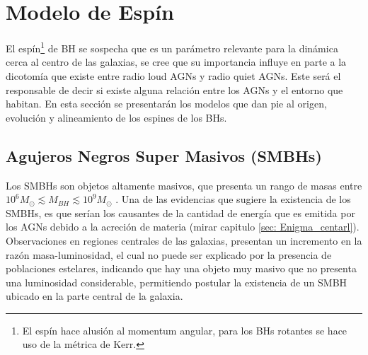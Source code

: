 \begin{savequote}[50mm]
\end{savequote}




\chapter{Modelo de Espín}
\label{cha:Modelo de Spin}

El espín\footnote{El espín hace alusión al momentum angular, para los BHs rotantes se hace uso de la métrica de Kerr.} de BH se sospecha que es un parámetro relevante para la dinámica cerca al centro de las galaxias, se cree que su importancia influye en parte a la dicotomía que existe entre radio loud AGNs y radio quiet AGNs. Este será el responsable de decir si existe alguna relación entre los AGNs y el entorno que habitan. En esta sección se presentarán los modelos que dan pie al origen, evolución y  alineamiento de los espines de los BHs.

\section{Agujeros Negros Super Masivos (SMBHs)}
\label{sec: SMBH}
Los SMBHs son objetos altamente masivos, que presenta un rango de masas entre $10^6M_{\odot}\lesssim M_{BH} \lesssim 10^{9}M_{\odot}$ \cite{mo2010}. Una de las evidencias que sugiere la existencia de los SMBHs, es que serían los causantes de la cantidad de energía que es emitida por los AGNs debido a la acreción de materia (mirar capitulo \ref{sec: Enigma_centarl}). Observaciones en regiones centrales de las galaxias, presentan un incremento en la razón masa-luminosidad, el cual no puede ser explicado por la presencia de poblaciones estelares, indicando que hay una objeto muy masivo que no presenta una luminosidad considerable, permitiendo postular la existencia de un SMBH ubicado en la parte central de la galaxia.  

